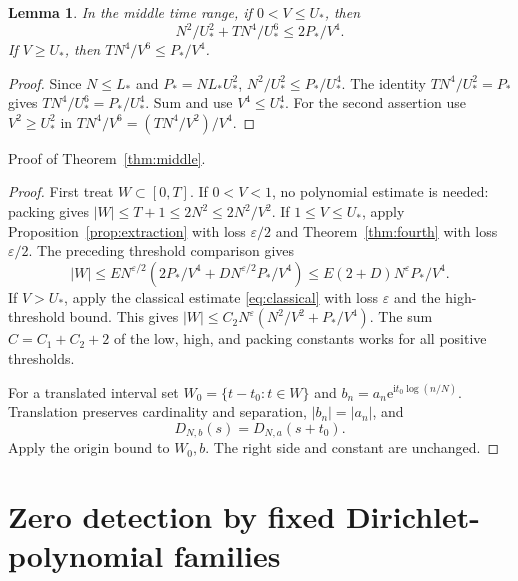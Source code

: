 \documentclass[11pt,a4paper,oneside]{article}
\newtheorem{lemma}[theorem]{Lemma}
\theoremstyle{definition}
\newcommand{\eps}{\varepsilon}
\newcommand{\ii}{\mathrm i}
\newcommand{\e}{\mathrm e}
\numberwithin{equation}{section}
\begin{document}
\begin{lemma}
In the middle time range, if $0<V\le U_*$, then
\[
 N^2/U_*^2+TN^4/U_*^6\le2P_*/V^4.
\]
If $V\ge U_*$, then $TN^4/V^6\le P_*/V^4$.
\end{lemma}
\begin{proof}
Since $N\le L_*$ and $P_*=NL_*U_*^2$,
$N^2/U_*^2\le P_*/U_*^4$.
The identity $TN^4/U_*^2=P_*$ gives
$TN^4/U_*^6=P_*/U_*^4$. Sum and use $V^4\le U_*^4$.
For the second assertion use $V^2\ge U_*^2$ in
$TN^4/V^6=(TN^4/V^2)/V^4$.
\end{proof}
Proof of Theorem~\ref{thm:middle}.
\begin{proof}
First treat $W\subset[0,T]$. If $0<V<1$, no polynomial estimate is needed:
packing gives $|W|\le T+1\le2N^2\le2N^2/V^2$.
If $1\le V\le U_*$, apply Proposition~\ref{prop:extraction} with loss
$\eps/2$ and Theorem~\ref{thm:fourth} with loss $\eps/2$.
The preceding threshold comparison gives
\[
 |W|\le E N^{\eps/2}
   \left(2P_*/V^4+D N^{\eps/2}P_*/V^4\right)
 \le E(2+D)N^\eps P_*/V^4.
\]
If $V>U_*$, apply the classical estimate
\eqref{eq:classical} with loss $\eps$ and the high-threshold bound.
This gives $|W|\le C_2N^\eps(N^2/V^2+P_*/V^4)$.
The sum $C=C_1+C_2+2$ of the low, high, and packing constants works for
all positive thresholds.

For a translated interval set
$W_0=\{t-t_0:t\in W\}$ and
$b_n=a_n\e^{\ii t_0\log(n/N)}$.
Translation preserves cardinality and separation, $|b_n|=|a_n|$, and
\[
 D_{N,b}(s)=D_{N,a}(s+t_0).
\]
Apply the origin bound to $W_0,b$. The right side and constant are unchanged.
\end{proof}
\section{Zero detection by fixed Dirichlet-polynomial families}\label{ch:detector}
\end{document}
